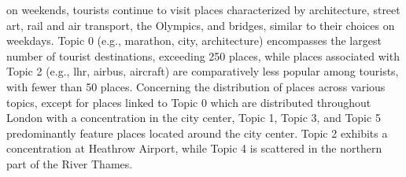 \documentclass{article}
\theoremstyle{definition}
\theoremstyle{remark}
\begin{document}
on weekends, tourists continue to visit places characterized by architecture, street art, rail and air transport, the Olympics, and bridges, similar to their choices on weekdays. Topic 0 (e.g., marathon, city, architecture) encompasses the largest number of tourist destinations, exceeding 250 places, while places associated with Topic 2 (e.g., lhr, airbus, aircraft) are comparatively less popular among tourists, with fewer than 50 places. Concerning the distribution of places across various topics, except for places linked to Topic 0 which are distributed throughout London with a concentration in the city center, Topic 1, Topic 3, and Topic 5 predominantly feature places located around the city center. Topic 2 exhibits a concentration at Heathrow Airport, while Topic 4 is scattered in the northern part of the River Thames.
\end{document}
